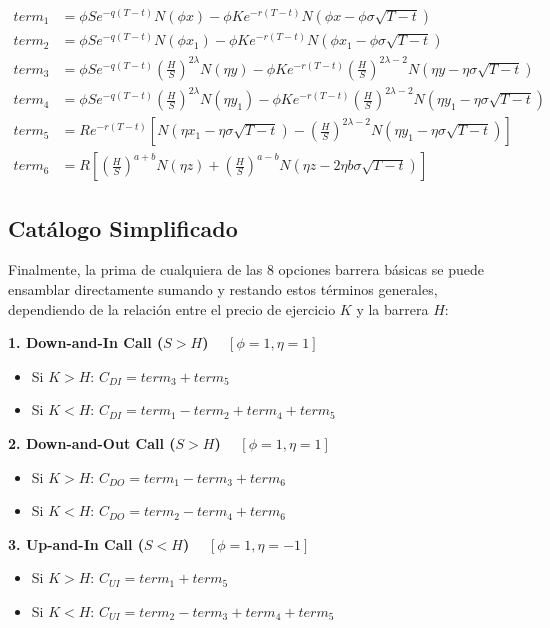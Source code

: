 \begin{align}
term_1 &= \phi S e^{-q(T-t)} N(\phi x) - \phi K e^{-r(T-t)} N(\phi x - \phi\sigma\sqrt{T-t}) \\
term_2 &= \phi S e^{-q(T-t)} N(\phi x_1) - \phi K e^{-r(T-t)} N(\phi x_1 - \phi\sigma\sqrt{T-t}) \\
term_3 &= \phi S e^{-q(T-t)} \left(\frac{H}{S}\right)^{2\lambda} N(\eta y) - \phi K e^{-r(T-t)}\left(\frac{H}{S}\right)^{2\lambda - 2} N(\eta y - \eta\sigma\sqrt{T-t}) \\
term_4 &= \phi S e^{-q(T-t)} \left(\frac{H}{S}\right)^{2\lambda} N(\eta y_1) - \phi K e^{-r(T-t)}\left(\frac{H}{S}\right)^{2\lambda - 2} N(\eta y_1 - \eta\sigma\sqrt{T-t}) \\
term_5 &= R e^{-r(T-t)} \left[ N(\eta x_1 - \eta\sigma \sqrt{T-t}) - \left(\frac{H}{S}\right)^{2\lambda - 2} N(\eta y_1 - \eta\sigma\sqrt{T-t}) \right] \\
term_6 &= R \left[ \left(\frac{H}{S}\right)^{a+b} N(\eta z) + \left(\frac{H}{S}\right)^{a-b} N(\eta z - 2\eta b\sigma\sqrt{T-t}) \right]
\end{align}

\subsection{Catálogo Simplificado}
Finalmente, la prima de cualquiera de las 8 opciones barrera básicas se puede ensamblar directamente sumando y restando estos términos generales, dependiendo de la relación entre el precio de ejercicio $K$ y la barrera $H$:

\textbf{1. Down-and-In Call ($S > H$)} $\quad [\phi = 1, \eta = 1]$
\begin{itemize}
    \item Si $K > H$: $C_{DI} = term_3 + term_5$
    \item Si $K < H$: $C_{DI} = term_1 - term_2 + term_4 + term_5$
\end{itemize}

\textbf{2. Down-and-Out Call ($S > H$)} $\quad [\phi = 1, \eta = 1]$
\begin{itemize}
    \item Si $K > H$: $C_{DO} = term_1 - term_3 + term_6$
    \item Si $K < H$: $C_{DO} = term_2 - term_4 + term_6$
\end{itemize}

\textbf{3. Up-and-In Call ($S < H$)} $\quad [\phi = 1, \eta = -1]$
\begin{itemize}
    \item Si $K > H$: $C_{UI} = term_1 + term_5$
    \item Si $K < H$: $C_{UI} = term_2 - term_3 + term_4 + term_5$
\end{itemize}

